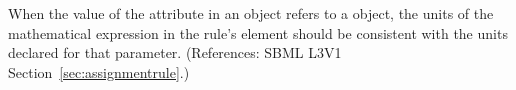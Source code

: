 When the value of the attribute  in an \AssignmentRule
object refers to a \Parameter object, the units of the mathematical
expression in the rule's  element should be consistent with the
units declared for that parameter.  (References: SBML L3V1
Section~\ref{sec:assignmentrule}.)
